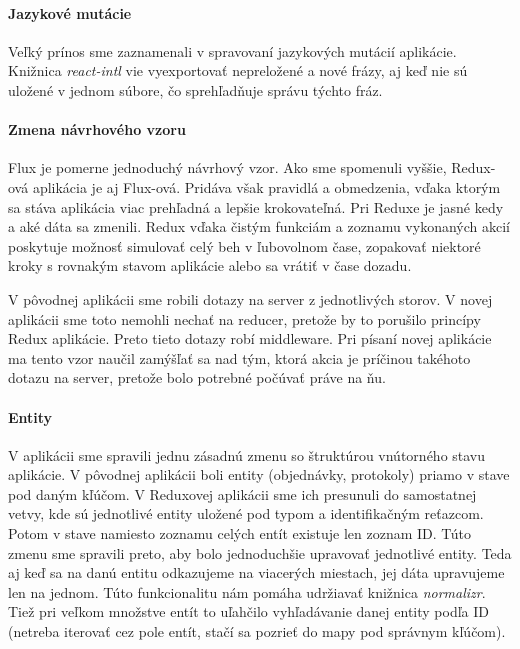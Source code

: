 \paragraph{Jazykové mutácie}
Veľký prínos sme zaznamenali v spravovaní jazykových mutácií aplikácie. Knižnica \emph{react-intl} vie vyexportovať nepreložené a nové frázy, aj keď nie sú uložené v jednom súbore, čo sprehľadňuje správu týchto fráz.

\paragraph{Zmena návrhového vzoru}
\NEW{}
Flux je pomerne jednoduchý návrhový vzor. Ako sme spomenuli vyššie, Redux-ová aplikácia je aj Flux-ová. Pridáva však pravidlá a obmedzenia, vďaka ktorým sa stáva aplikácia viac prehľadná a lepšie krokovateľná. Pri Reduxe je jasné kedy a aké dáta sa zmenili. Redux vďaka čistým funkciám a zoznamu vykonaných akcií poskytuje možnosť simulovať celý beh v ľubovolnom čase, zopakovať niektoré kroky s rovnakým stavom aplikácie alebo sa vrátiť v čase dozadu.

V pôvodnej aplikácii sme robili dotazy na server z jednotlivých storov. V novej aplikácii sme toto nemohli nechať na reducer, pretože by to porušilo princípy Redux aplikácie. Preto tieto dotazy robí middleware. Pri písaní novej aplikácie ma tento vzor naučil zamýšľať sa nad tým, ktorá akcia je príčinou takéhoto dotazu na server, pretože bolo potrebné počúvať práve na ňu.

%

\paragraph{Entity}%
V aplikácii sme spravili jednu zásadnú zmenu so štruktúrou vnútorného stavu aplikácie. V pôvodnej aplikácii boli entity (objednávky, protokoly) priamo v stave pod daným kľúčom. 
V Reduxovej aplikácii sme ich presunuli do samostatnej vetvy, kde sú jednotlivé entity uložené pod typom a identifikačným reťazcom. Potom v stave namiesto zoznamu celých entít existuje len zoznam ID. 
Túto zmenu sme spravili preto, aby bolo jednoduchšie upravovať jednotlivé entity. Teda aj keď sa na danú entitu odkazujeme na viacerých miestach, jej dáta upravujeme len na jednom. Túto funkcionalitu nám pomáha udržiavať knižnica \emph{normalizr}.
Tiež pri veľkom množstve entít to uľahčilo vyhľadávanie danej entity podľa ID (netreba iterovať cez pole entít, stačí sa pozrieť do mapy pod správnym kľúčom).

